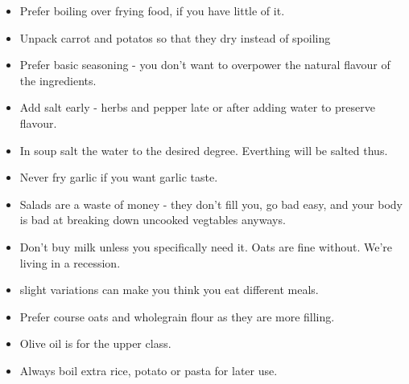 
  \begin{itemize}
    \item Prefer boiling over frying food, if you have little of it.
    \item Unpack carrot and potatos so that they dry instead of spoiling
    \item Prefer basic seasoning - you don't want to overpower the
      natural flavour
      of the ingredients.
    \item Add salt early - herbs and pepper late or after adding
      water to preserve flavour.
    \item In soup salt the water to the desired degree. Everthing will be salted
      thus.
    \item Never fry garlic if you want garlic taste.
    \item Salads are a waste of money - they don't fill you, go bad easy, and
      your body is bad at breaking down uncooked vegtables anyways.
    \item Don't buy milk unless you specifically need it. Oats
      are fine without. We're living in a recession.
    \item slight variations can make you think you eat different meals.
    \item Prefer course oats and wholegrain flour as they are more filling.
    \item Olive oil is for the upper class.
    \item Always boil extra rice, potato or pasta for later use.
  \end{itemize}

  \clearpage
